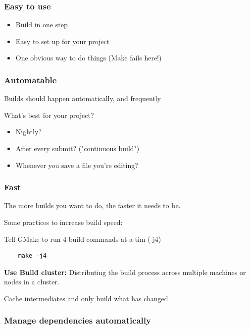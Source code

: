\documentclass{article}
\begin{document}
\subsubsection{Easy to use}
\begin{itemize}
    \item Build in one step
    \item Easy to set up for your project 
    \item One obvious way to do things (Make fails here!)
\end{itemize}

\subsubsection{Automatable}

Builds should happen automatically, and frequently

What's best for your project?
\begin{itemize}
    \item Nightly?
    \item After every submit? ("continuous build")
    \item Whenever you save a file you're editing?
\end{itemize}

\subsubsection{Fast}

The more builds you want to do, the faster it needs to be.

\vspace*{1em}

Some practices to increase build speed:

Tell GMake to run 4 build commands at a tim (-j4)
\begin{verbatim}
    make -j4 
\end{verbatim}

\textbf{Use Build cluster:} Distributing the build process across multiple machines or nodes in a cluster.

\vspace*{1em}

Cache intermediates and only build what has changed.

\subsubsection{Manage dependencies automatically}
\end{document}
